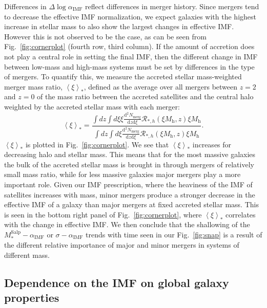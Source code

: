 \documentclass[usenatbib]{mnras}
\def\mhalo{M_{\mathrm{h}}}
\def\msalp{M_*^{\mathrm{Salp}}}
\def\aimf{\alpha_{\mathrm{IMF}}}
\def\Fref#1{Fig.~\ref{#1}\xspace}
\begin{document}
Differences in $\Delta\log{\aimf}$ reflect differences in merger
history.  Since mergers tend to decrease the effective IMF
normalization, we expect galaxies with the highest increase in stellar
mass to also show the largest changes in effective IMF. However this
is not observed to be the case, as can be seen from
\Fref{fig:cornerplot} (fourth row, third column).  If the amount of
accretion does not play a central role in setting the final IMF, then
the different change in IMF between low-mass and high-mass systems
must be set by differences in the type of mergers. To quantify this,
we measure the accreted stellar mass-weighted merger mass ratio,
$\left< \xi \right>_*$, defined as the average over all mergers
between $z=2$ and $z=0$ of the mass ratio between the accreted
satellites and the central halo weighted by the accreted stellar mass
with each merger:
\begin{equation}\label{eq:xieff}
\left< \xi \right>_* = \frac{\int dz \int d\xi \xi \frac{\mathrm{d}^2N_{\mathrm{merg}}}{\mathrm{d}z \mathrm{d}\xi} \mathcal{R}_{*,h}(\xi \mhalo, z)\xi\mhalo}{\int dz \int d\xi  \frac{\mathrm{d}^2N_{\mathrm{merg}}}{\mathrm{d}z \mathrm{d}\xi} \mathcal{R}_{*,h}(\xi \mhalo, z)\xi\mhalo}.
\end{equation}
$\left< \xi \right>_*$ is plotted in \Fref{fig:cornerplot}. We see that $\left< \xi \right>_*$ increases for decreasing halo and stellar mass.
This means that for the most massive galaxies the bulk of the accreted stellar mass is brought in through mergers of relatively small mass ratio, while for less massive galaxies major mergers play a more important role.
Given our IMF prescription, where the heaviness of the IMF of satellites increases with mass, minor mergers produce a stronger decrease in the effective IMF of a galaxy than major mergers at fixed accreted stellar mass. 
This is seen in the bottom right panel of \Fref{fig:cornerplot}, where $\left< \xi \right>_*$ correlates with the change in effective IMF.
We then conclude that the shallowing of the $\msalp-\aimf$ or $\sigma-\aimf$ trends with time seen in our \Fref{fig:snap} is a result of the different relative importance of major and minor mergers in systems of different mass.




\subsection{Dependence on the IMF on global galaxy properties}
\end{document}
